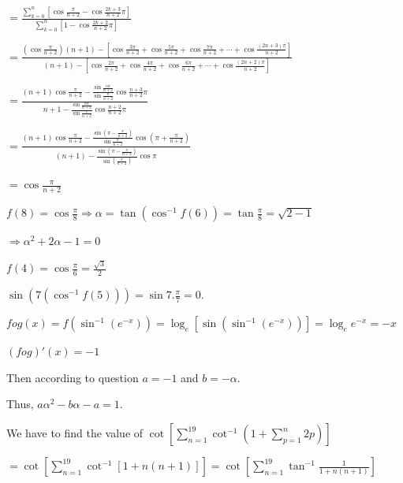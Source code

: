   $= \displaystyle\frac{\displaystyle\sum_{k = 0}^n\left[\cos\frac{\pi}{n + 2} - \cos\frac{2k + 3}{n +
      2}\pi\right]}{\displaystyle\sum_{k = 0}^n\left[1 - \cos\frac{2k + 2}{n + 2}\pi\right]}$

  $= \displaystyle\frac{\displaystyle\left(\cos\frac{\pi}{n + 2}\right)(n + 1) - \left[\cos\frac{3\pi}{n +
      2} + \cos\frac{5\pi}{n + 2} + \cos\frac{7\pi}{n + 2} + \cdots + \cos\frac{(2n + 3)\pi}{n +
      2}\right]}{\displaystyle(n + 1) - \left[\cos\frac{2\pi}{n +
      2} + \cos\frac{4\pi}{n + 2} + \cos\frac{6\pi}{n + 2} + \cdots + \cos\frac{(2n + 2)\pi}{n +
      2}\right]}$

  $= \displaystyle \frac{\displaystyle(n + 1)\cos\frac{\pi}{n + 2} - \frac{\sin\frac{n\pi}{n +
        2}}{\sin\frac{\pi}{n + 2}}\cos\frac{n + 3}{n + 2}\pi}{n + 1 - \displaystyle\frac{\sin\frac{n\pi}{n +
      2}}{\sin\frac{\pi}{n + 2}}\cos\frac{n + 2}{n + 2}\pi}$

  $=\displaystyle\frac{(n + 1)\cos\frac{\pi}{n + 2} - \frac{\sin\left(\pi - \frac{\pi}{n +
      2}\right)}{\sin\frac{\pi}{n + 2}}\cos\left(\pi + \frac{\pi}{n + 2}\right)}{(n + 1)
  - \frac{\sin\left(\pi - \frac{\pi}{n + 2}\right)}{\sin\left(\frac{\pi}{n + 2}\right)}\cos\pi}$

  $= \cos\frac{\pi}{n + 2}$

  $f(8) = \cos\frac{\pi}{8}\Rightarrow \alpha = \tan\left(\cos^{-1}f(6)\right) = \tan\frac{\pi}{8} = \sqrt{2
  - 1}$

  $\Rightarrow \alpha^2 + 2\alpha - 1 = 0$

  $f(4) = \cos\frac{\pi}{6} = \frac{\sqrt{3}}{2}$

  $\sin\left(7\left(\cos^{-1}f(5)\right)\right) = \sin7.\frac{\pi}{7} = 0$.
\item $fog(x) = f\left(\sin^{-1}\left(e^{-x}\right)\right)
  = \log_e\left[\sin\left(\sin^{-1}\left(e^{-x}\right)\right)\right] = \log_ee^{-x} = -x$

  $(fog)'(x) = -1$

  Then according to question $a = -1$ and $b = -\alpha$.

  Thus, $a\alpha^2 - b\alpha - a = 1$.
\item We have to find the value of $\displaystyle\cot\left[\sum_{n = 1}^{19}\cot^{-1}\left(1 + \sum_{p =
    1}^n2p\right)\right]$

  $= \displaystyle\cot\left[\sum_{n = 1}^{19}\cot^{-1}[1 + n(n + 1)]\right] = \cot\left[\sum_{n =
    1}^{19}\tan^{-1}\frac{1}{1 + n(n + 1)}\right]$

